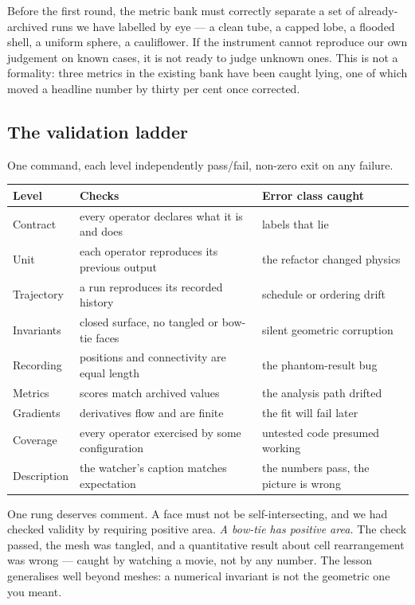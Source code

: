 \documentclass[11pt]{article}
\begin{document}
Before the first round, the metric bank must correctly separate a set of already-archived runs we
have labelled by eye --- a clean tube, a capped lobe, a flooded shell, a uniform sphere, a
cauliflower. If the instrument cannot reproduce our own judgement on known cases, it is not ready
to judge unknown ones. This is not a formality: three metrics in the existing bank have been
caught lying, one of which moved a headline number by thirty per cent once corrected.

\subsection*{The validation ladder}

One command, each level independently pass/fail, non-zero exit on any failure.

\begin{center}\small
\begin{tabular}{@{}lll@{}}
\toprule
\textbf{Level} & \textbf{Checks} & \textbf{Error class caught} \\
\midrule
Contract    & every operator declares what it is and does & labels that lie \\
Unit        & each operator reproduces its previous output & the refactor changed physics \\
Trajectory  & a run reproduces its recorded history & schedule or ordering drift \\
Invariants  & closed surface, no tangled or bow-tie faces & silent geometric corruption \\
Recording   & positions and connectivity are equal length & the phantom-result bug \\
Metrics     & scores match archived values & the analysis path drifted \\
Gradients   & derivatives flow and are finite & the fit will fail later \\
Coverage    & every operator exercised by some configuration & untested code presumed working \\
Description & the watcher's caption matches expectation & the numbers pass, the picture is wrong \\
\bottomrule
\end{tabular}
\end{center}

One rung deserves comment. A face must not be self-intersecting, and we had checked validity by
requiring positive area. \emph{A bow-tie has positive area.} The check passed, the mesh was
tangled, and a quantitative result about cell rearrangement was wrong --- caught by watching a
movie, not by any number. The lesson generalises well beyond meshes: a numerical invariant is not
the geometric one you meant.
\end{document}
